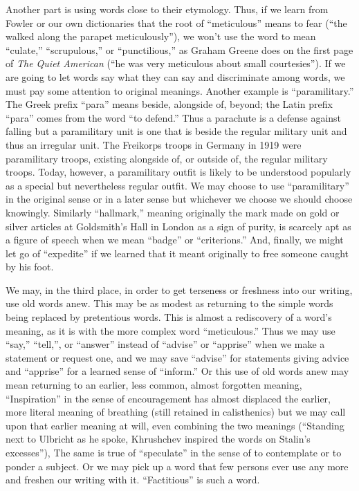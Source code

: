 \documentclass[
    oneside,
    11pt,
    draft
]{memoir}
\begin{document}
Another part is using words close to their etymology. Thus, if we learn from Fowler or our own dictionaries that the root of \enquote{meticulous} means to fear (\enquote{the walked along the parapet meticulously}), we won't use the word to mean \enquote{culate,} \enquote{scrupulous,} or \enquote{punctilious,} as Graham Greene does on the first page of \emph{The Quiet American} (\enquote{he was very meticulous about small courtesies}). If we are going to let words say what they can say and discriminate among words, we must pay some attention to original meanings. Another example is \enquote{paramilitary.} The Greek prefix \enquote{para} means beside, alongside of, beyond; the Latin prefix \enquote{para} comes from the word \enquote{to defend.} Thus a parachute is a defense against falling but a paramilitary unit is one that is beside the regular military unit and thus an irregular unit. The Freikorps troops in Germany in 1919 were paramilitary troops, existing alongside of, or outside of, the regular military troops. Today, however, a paramilitary outfit is likely to be understood popularly as a special but nevertheless regular outfit. We may choose to use \enquote{paramilitary} in the original sense or in a later sense but whichever we choose we should choose knowingly. Similarly \enquote{hallmark,} meaning originally the mark made on gold or silver articles at Goldsmith's Hall in London as a sign of purity, is scarcely apt as a figure of speech when we mean \enquote{badge} or \enquote{criterions.} And, finally, we might let go of \enquote{expedite} if we learned that it meant originally to free someone caught by his foot.

We may, in the third place, in order to get terseness or freshness into our writing, use old words anew. This may be as modest as returning to the simple words being replaced by pretentious words. This is almost a rediscovery of a word's meaning, as it is with the more complex word \enquote{meticulous.} Thus we may use \enquote{say,} \enquote{tell,}, or \enquote{answer} instead of \enquote{advise} or \enquote{apprise} when we make a statement or request one, and we may save \enquote{advise} for statements giving advice and \enquote{apprise} for a learned sense of \enquote{inform.} Or this use of old words anew may mean returning to an earlier, less common, almost forgotten meaning, \enquote{Inspiration} in the sense of encouragement has almost displaced the earlier, more literal meaning of breathing (still retained in calisthenics) but we may call upon that earlier meaning at will, even combining the two meanings (\enquote{Standing next to Ulbricht as he spoke, Khrushchev inspired the words on Stalin's excesses}), The same is true of \enquote{speculate} in the sense of to contemplate or to ponder a subject. Or we may pick up a word that few persons ever use any more and freshen our writing with it. \enquote{Factitious} is such a word.
\end{document}
